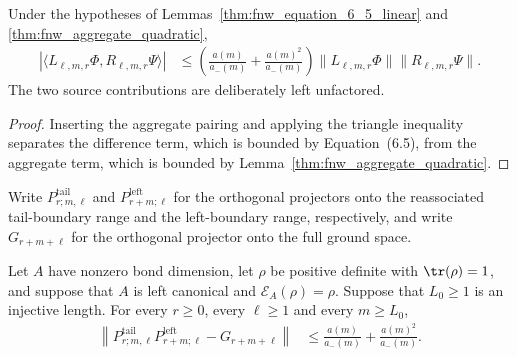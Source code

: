 \begin{lemma}
    \label{thm:fnw_overlap_linear_add_quadratic}
    \leanok
    Under the hypotheses of
    Lemmas~\ref{thm:fnw_equation_6_5_linear} and
    \ref{thm:fnw_aggregate_quadratic},
    \begin{align}
        |\langle L_{\ell,m,r}\Phi,R_{\ell,m,r}\Psi\rangle|
         & \leq\left(\frac{a(m)}{a_-(m)}
        +\frac{a(m)^2}{a_-(m)}\right)
        \lVert L_{\ell,m,r}\Phi\rVert
        \lVert R_{\ell,m,r}\Psi\rVert.
        \label{eq:fnw_overlap_linear_add_quadratic}
    \end{align}
    The two source contributions are deliberately left unfactored.
\end{lemma}

\begin{proof}
    \leanok
    Inserting the aggregate pairing and applying the triangle inequality
    separates the difference term, which is bounded by Equation~(6.5), from
    the aggregate term, which is bounded by
    Lemma~\ref{thm:fnw_aggregate_quadratic}.
\end{proof}

Write $P^{\mathrm{tail}}_{r;m,\ell}$ and
$P^{\mathrm{left}}_{r+m;\ell}$ for the orthogonal projectors onto the
reassociated tail-boundary range and the left-boundary range, respectively,
and write $G_{r+m+\ell}$ for the orthogonal projector onto the full ground
space.

\begin{lemma}
    \label{thm:fnw_projector_defect_unfactored}
    \leanok
    Let $A$ have nonzero bond dimension, let $\rho$ be positive definite with
    $\tr(\rho)=1$, and suppose that $A$ is left canonical and
    $\mathcal E_A(\rho)=\rho$. Suppose that $L_0\geq1$ is an injective length.
    For every $r\geq0$, every $\ell\geq1$ and every $m\geq L_0$,
    \begin{align}
        \left\lVert
        P^{\mathrm{tail}}_{r;m,\ell}P^{\mathrm{left}}_{r+m;\ell}
        -G_{r+m+\ell}
        \right\rVert
         & \leq \frac{a(m)}{a_-(m)}+\frac{a(m)^2}{a_-(m)}.
        \label{eq:fnw_projector_defect_unfactored}
    \end{align}
\end{lemma}

